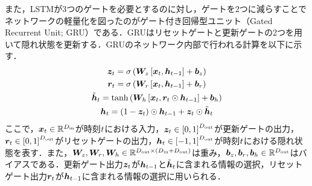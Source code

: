 \documentclass[12pt]{jarticle}
\numberwithin{equation}{section}    %
\numberwithin{figure}{section}      %
\numberwithin{table}{section}      %
\begin{document}
また，LSTMが3つのゲートを必要とするのに対し，ゲートを2つに減らすことでネットワークの軽量化を図ったのがゲート付き回帰型ユニット（Gated Recurrent Unit; GRU）\cite{cho2014learning}である．GRUはリセットゲートと更新ゲートの2つを用いて隠れ状態を更新する．GRUのネットワーク内部で行われる計算を以下に示す．
\begin{gather}
    \bm{z}_{t} = \sigma\left(\bm{W}_{z}\left[\bm{x}_{t}, \bm{h}_{t-1}\right] + \bm{b}_{z}\right) \\
    \bm{r}_{t} = \sigma\left(\bm{W}_{r}\left[\bm{x}_{t}, \bm{h}_{t-1}\right] + \bm{b}_{r}\right) \\
    \tilde{\bm{h}}_{t} = \tanh\left(\bm{W}_{h}\left[\bm{x}_{t}, \bm{r}_{t} \odot \bm{h}_{t-1}\right] + \bm{b}_{h}\right) \\
    \bm{h}_{t} = \left(1 - \bm{z}_{t}\right) \odot \bm{h}_{t-1} + \bm{z}_{t} \odot \tilde{\bm{h}}_{t}
\end{gather}
ここで，$\bm{x}_{t} \in \mathbb{R}^{D_{\text{in}}}$が時刻$t$における入力，$\bm{z}_{t} \in \left[0, 1\right]^{D_{\text{out}}}$が更新ゲートの出力，$\bm{r}_{t} \in \left[0, 1\right]^{D_{\text{out}}}$がリセットゲートの出力，$\bm{h}_{t} \in \left[-1, 1\right]^{D_{\text{out}}}$が時刻$t$における隠れ状態を表す．また，$\bm{W}_{z}, \bm{W}_{r}, \bm{W}_{h} \in \mathbb{R}^{D_{\text{out}} \times \left(D_{\text{in}} + D_{\text{out}}\right)}$は重み，$\bm{b}_{z}, \bm{b}_{r}, \bm{b}_{h} \in \mathbb{R}^{D_{\text{out}}}$はバイアスである．更新ゲート出力$\bm{z}_{t}$が$\bm{h}_{t - 1}$と$\tilde{\bm{h}}_{t}$に含まれる情報の選択，リセットゲート出力$\bm{r}_{t}$が$\bm{h}_{t - 1}$に含まれる情報の選択に用いられる．
\end{document}
